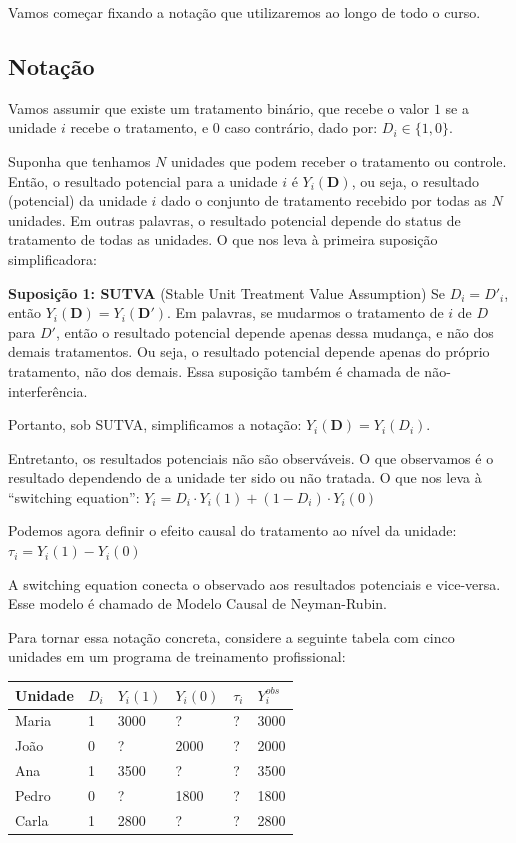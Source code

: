 \documentclass[
]{article}
\begin{document}
Vamos começar fixando a notação que utilizaremos ao longo de todo o curso.

\subsection{Notação}\label{notauxe7uxe3o}

Vamos assumir que existe um tratamento binário, que recebe o valor \(1\) se a unidade \(i\) recebe o tratamento, e \(0\) caso contrário, dado por: \(D_i \in \{1,0\}\).

Suponha que tenhamos \(N\) unidades que podem receber o tratamento ou controle. Então, o resultado potencial para a unidade \(i\) é \(Y_i(\mathbf{D})\), ou seja, o resultado (potencial) da unidade \(i\) dado o conjunto de tratamento recebido por todas as \(N\) unidades. Em outras palavras, o resultado potencial depende do status de tratamento de todas as unidades. O que nos leva à primeira suposição simplificadora:

\textbf{Suposição 1: SUTVA} (Stable Unit Treatment Value Assumption)
Se \(D_i = D'_i\), então \(Y_i(\mathbf{D}) = Y_i(\mathbf{D}')\). Em palavras, se mudarmos o tratamento de \(i\) de \(D\) para \(D'\), então o resultado potencial depende apenas dessa mudança, e não dos demais tratamentos. Ou seja, o resultado potencial depende apenas do próprio tratamento, não dos demais. Essa suposição também é chamada de não-interferência.

Portanto, sob SUTVA, simplificamos a notação: \(Y_i(\mathbf{D}) = Y_i(D_i)\).

Entretanto, os resultados potenciais não são observáveis. O que observamos é o resultado dependendo de a unidade ter sido ou não tratada. O que nos leva à ``switching equation'':
\(Y_i = D_i \cdot Y_i(1) + (1-D_i) \cdot Y_i(0)\)

Podemos agora definir o efeito causal do tratamento ao nível da unidade: \(\tau_i = Y_i(1) - Y_i(0)\)

A switching equation conecta o observado aos resultados potenciais e vice-versa. Esse modelo é chamado de Modelo Causal de Neyman-Rubin.

Para tornar essa notação concreta, considere a seguinte tabela com cinco unidades em um programa de treinamento profissional:

\begin{longtable}[]{@{}llllll@{}}
\toprule\noalign{}
Unidade & \(D_i\) & \(Y_i(1)\) & \(Y_i(0)\) & \(\tau_i\) & \(Y_i^{obs}\) \\
\midrule\noalign{}
\endhead
\bottomrule\noalign{}
\endlastfoot
Maria & 1 & 3000 & ? & ? & 3000 \\
João & 0 & ? & 2000 & ? & 2000 \\
Ana & 1 & 3500 & ? & ? & 3500 \\
Pedro & 0 & ? & 1800 & ? & 1800 \\
Carla & 1 & 2800 & ? & ? & 2800 \\
\end{longtable}
\end{document}
